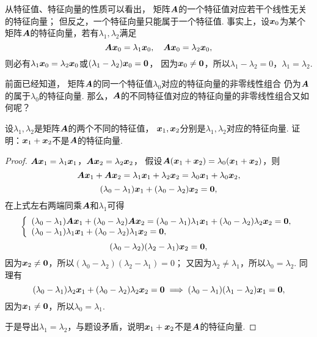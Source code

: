 从特征值、特征向量的性质可以看出，
矩阵\(\boldsymbol{A}\)的一个特征值对应若干个线性无关的特征向量；
但反之，一个特征向量只能属于一个特征值.
事实上，设\(\boldsymbol{x}_0\)为某个矩阵\(\boldsymbol{A}\)的特征向量，若有\(\lambda_1,\lambda_2\)满足\[
	\boldsymbol{A}\boldsymbol{x}_0=\lambda_1\boldsymbol{x}_0,
	\quad
	\boldsymbol{A}\boldsymbol{x}_0=\lambda_2\boldsymbol{x}_0,
\]
则必有\(\lambda_1\boldsymbol{x}_0=\lambda_2\boldsymbol{x}_0\)或\((\lambda_1-\lambda_2)\boldsymbol{x}_0=\boldsymbol0\)，
因为\(\boldsymbol{x}_0\neq\boldsymbol0\)，所以\(\lambda_1-\lambda_2=0\)，\(\lambda_1=\lambda_2\).

前面已经知道，
矩阵\(\boldsymbol{A}\)的同一个特征值\(\lambda_0\)对应的特征向量的非零线性组合
仍为\(\boldsymbol{A}\)的属于\(\lambda_0\)的特征向量.
那么，\(\boldsymbol{A}\)的不同特征值对应的特征向量的非零线性组合又如何呢？
\begin{example}
设\(\lambda_1,\lambda_2\)是矩阵\(\boldsymbol{A}\)的两个不同的特征值，
\(\boldsymbol{x}_1,\boldsymbol{x}_2\)分别是\(\lambda_1,\lambda_2\)对应的特征向量.
证明：\(\boldsymbol{x}_1+\boldsymbol{x}_2\)不是\(\boldsymbol{A}\)的特征向量.
\begin{proof}
\(\boldsymbol{A}\boldsymbol{x}_1 = \lambda_1\boldsymbol{x}_1\)，\(\boldsymbol{A}\boldsymbol{x}_2 = \lambda_2\boldsymbol{x}_2\)，
假设\(\boldsymbol{A}(\boldsymbol{x}_1+\boldsymbol{x}_2) = \lambda_0(\boldsymbol{x}_1+\boldsymbol{x}_2)\)，则\[
	\boldsymbol{A}\boldsymbol{x}_1+\boldsymbol{A}\boldsymbol{x}_2 =\lambda_1\boldsymbol{x}_1+\lambda_2\boldsymbol{x}_2 = \lambda_0\boldsymbol{x}_1+\lambda_0\boldsymbol{x}_2,
\]\[
	(\lambda_0-\lambda_1)\boldsymbol{x}_1+(\lambda_0-\lambda_2)\boldsymbol{x}_2 = \boldsymbol0,
\]
在上式左右两端同乘\(\boldsymbol{A}\)和\(\lambda_1\)可得\[
	\left\{ \begin{array}{l}
		(\lambda_0-\lambda_1)\boldsymbol{A}\boldsymbol{x}_1+(\lambda_0-\lambda_2)\boldsymbol{A}\boldsymbol{x}_2 = (\lambda_0-\lambda_1)\lambda_1\boldsymbol{x}_1 + (\lambda_0-\lambda_2)\lambda_2\boldsymbol{x}_2 = \boldsymbol0, \\
		(\lambda_0-\lambda_1)\lambda_1\boldsymbol{x}_1+(\lambda_0-\lambda_2)\lambda_1\boldsymbol{x}_2 = \boldsymbol0,
	\end{array} \right.
\]\[
	(\lambda_0-\lambda_2)(\lambda_2-\lambda_1)\boldsymbol{x}_2 = \boldsymbol0,
\]
因为\(\boldsymbol{x}_2\neq\boldsymbol0\)，所以\((\lambda_0-\lambda_2)(\lambda_2-\lambda_1)=0\)；
又因为\(\lambda_2\neq\lambda_1\)，所以\(\lambda_0=\lambda_2\).
同理有\[
	(\lambda_0-\lambda_1)\lambda_2\boldsymbol{x}_1+(\lambda_0-\lambda_2)\lambda_2\boldsymbol{x}_2 = \boldsymbol0
	\implies
	(\lambda_0-\lambda_1)(\lambda_1-\lambda_2)\boldsymbol{x}_1 = \boldsymbol0,
\]
因为\(\boldsymbol{x}_1\neq\boldsymbol0\)，所以\(\lambda_0=\lambda_1\).

于是导出\(\lambda_1=\lambda_2\)，与题设矛盾，说明\(\boldsymbol{x}_1+\boldsymbol{x}_2\)不是\(\boldsymbol{A}\)的特征向量.
\end{proof}
\end{example}

